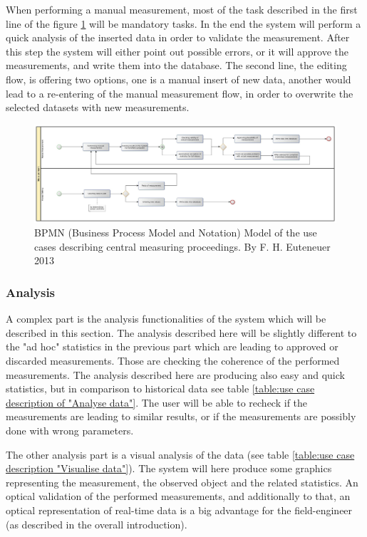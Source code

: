 When performing a manual measurement, most of the task described in the first line of the figure \ref{fig:bpmn_use-case_measuring} will be mandatory tasks. In the end the system will perform a quick analysis of the inserted data in order to validate the measurement. After this step the system will either point out possible errors, or it will approve the measurements, and write them into the database. The second line, the editing flow, is offering two options, one is a manual insert of new data, another would lead to a re-entering of the manual measurement flow, in order to overwrite the selected datasets with new measurements.

\begin{figure}[H]
	\centering
 	 \includegraphics[scale=0.24]{graphics/bpmn_use-cases_measurement.jpg} 
	\caption{BPMN (Business Process Model and Notation) Model of the use cases describing central measuring proceedings. By F. H. Euteneuer 2013}
	 \label{fig:bpmn_use-case_measuring}
\end{figure}

\subsubsection{Analysis}

A complex part is the analysis functionalities of the system which will be described in this section. The analysis described here will be slightly different to the "ad hoc" statistics in the previous part which are leading to approved or discarded measurements. Those are checking the coherence of the performed measurements. The analysis described here are producing also easy and quick statistics, but in comparison to historical data see table \ref{table:use case description of "Analyse data"}. The user will be able to recheck if the measurements are leading to similar results, or if the measurements are possibly done with wrong parameters. 

The other analysis part is a visual analysis of the data (see table \ref{table:use case description "Visualise data"}). The system will here produce some graphics representing the measurement, the observed object and the related statistics. An optical validation of the performed measurements, and additionally to that, an optical representation of real-time data is a big advantage for the field-engineer (as described in the overall introduction).

